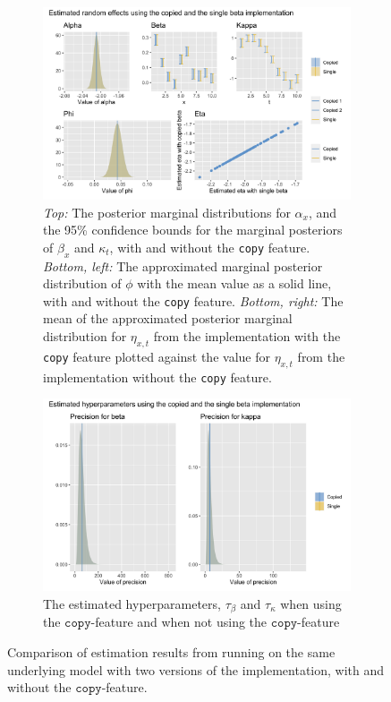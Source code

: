 \begin{figure}[h!]
    \centering
    \begin{subfigure}[b]{0.85\textwidth}
        \includegraphics[width=\textwidth]{synthetic-data/Figures/copy-beta.png}
        \caption{\textit{Top:} The posterior marginal distributions for $\alpha_x$, and the 95\% confidence bounds for the marginal posteriors of $\beta_x$ and $\kappa_t$, with and without the \texttt{copy} feature. \textit{Bottom, left:} The approximated marginal posterior distribution of $\phi$ with the mean value as a solid line, with and without the \texttt{copy} feature. \textit{Bottom, right:} The mean of the approximated posterior marginal distribution for $\eta_{x,t}$ from the implementation with the \texttt{copy} feature plotted against the value for $\eta_{x,t}$ from the implementation without the \texttt{copy} feature. }
        \label{fig:copyBetaComparison-top}
    \end{subfigure}
    
    \begin{subfigure}[b]{0.6\textwidth}
        \includegraphics[width=\textwidth]{synthetic-data/Figures/hyperparameters-LC-copy.png}
        \caption{The estimated hyperparameters, $\tau_\beta$ and $\tau_\kappa$ when using the $\texttt{copy}$-feature and when not using the $\texttt{copy}$-feature}
        \label{fig:copyBetaComparison-bottom}
    \end{subfigure}
    \caption{Comparison of estimation results from running \inlabru on the same underlying model with two versions of the implementation, with and without the $\texttt{copy}$-feature.}
    \label{fig:copyBetaComparison}
\end{figure}

